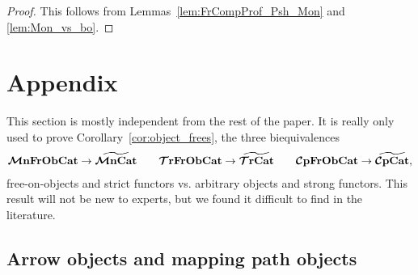 \documentclass[11pt,oneside,article]{memoir}
\begin{document}
\begin{proof}
   This follows from Lemmas~\ref{lem:FrCompProf_Psh_Mon} and \ref{lem:Mon_vs_bo}.
\end{proof}

\appendix
\chapter{Appendix}\label{appendix}

This section is mostly independent from the rest of the paper. It is really only used to prove Corollary~\ref{cor:object_frees}, the three biequivalences
\begin{gather*}
   \bm{\mathcal{M}}\mathbf{nFrObCat} \to \widetilde{\bm{\mathcal{M}}\mathbf{nCat}} \qquad
      \bm{\mathcal{T}}\mathbf{rFrObCat} \to \widetilde{\bm{\mathcal{T}}\mathbf{rCat}} \qquad
      \bm{\mathcal{C}}\mathbf{pFrObCat} \to \widetilde{\bm{\mathcal{C}}\mathbf{pCat}},
\end{gather*}
free-on-objects and strict functors vs. arbitrary objects and strong functors.  This result will not be new to experts, but we found it difficult to find in the literature.

\section{Arrow objects and mapping path objects}
\end{document}

